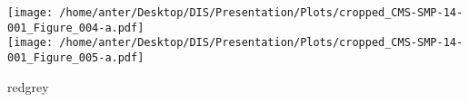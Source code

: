 \documentclass{beamer}
\begin{document}
\begin{frame}
\begin{minipage}[thbp]{0.6\textwidth}
\end{minipage}
\hspace*{-2mm}
\begin{minipage}[thbp]{0.1\textwidth}
\vspace{-6mm}
\hspace*{0mm}\texttt{[image: /home/anter/Desktop/DIS/Presentation/Plots/cropped\_CMS-SMP-14-001\_Figure\_004-a.pdf]}\\
\hspace*{0mm}\texttt{[image: /home/anter/Desktop/DIS/Presentation/Plots/cropped\_CMS-SMP-14-001\_Figure\_005-a.pdf]}\\
\hspace*{20mm}\begin{beamercolorbox}[wd=23mm,ht=1mm,center,shadow=true, rounded=true]{redgrey}
{}
{\scalebox {0.61} {}}
\end{beamercolorbox}
\end{minipage}
\end{frame}
\end{document}
